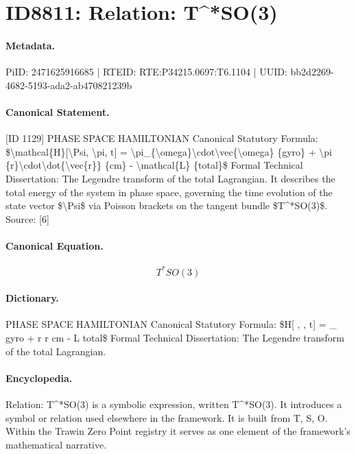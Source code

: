 \section*{ID8811: Relation: T\textasciicircum{}*SO(3)}
\paragraph{Metadata.}
PiID: 2471625916685 | RTEID: RTE:P34215.0697:T6.1104 | UUID: bb2d2269-4682-5193-ada2-ab470821239b

\paragraph{Canonical Statement.}
[ID 1129] PHASE SPACE HAMILTONIAN Canonical Statutory Formula: \$\textbackslash{}mathcal\{H\}[\textbackslash{}Psi, \textbackslash{}pi, t] = \textbackslash{}pi\_\{\textbackslash{}omega\}\textbackslash{}cdot\textbackslash{}vec\{\textbackslash{}omega\} \{gyro\} + \textbackslash{}pi \{r\}\textbackslash{}cdot\textbackslash{}dot\{\textbackslash{}vec\{r\}\} \{cm\} - \textbackslash{}mathcal\{L\} \{total\}\$ Formal Technical Dissertation: The Legendre transform of the total Lagrangian. It describes the total energy of the system in phase space, governing the time evolution of the state vector \$\textbackslash{}Psi\$ via Poisson brackets on the tangent bundle \$T\textasciicircum{}*SO(3)\$. Source: [6]

\paragraph{Canonical Equation.}
\[
T^*SO(3)
\]

\paragraph{Dictionary.}
PHASE SPACE HAMILTONIAN Canonical Statutory Formula: \$H[ , , t] = \_ gyro + r r cm - L total\$ Formal Technical Dissertation: The Legendre transform of the total Lagrangian.

\paragraph{Encyclopedia.}
Relation: T\textasciicircum{}*SO(3) is a symbolic expression, written T\textasciicircum{}*SO(3). It introduces a symbol or relation used elsewhere in the framework. It is built from T, S, O. Within the Trawin Zero Point registry it serves as one element of the framework's mathematical narrative.

